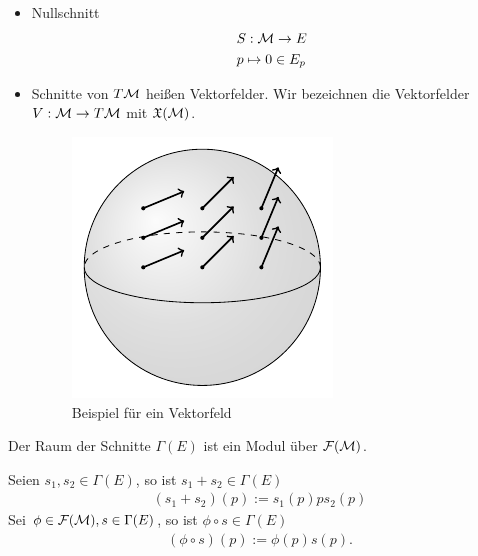 \begin{bsp}[Schnitte] \leavevmode
\begin{itemize}
\item Nullschnitt
\begin{align}
&S : \mathcal{M} \to E \\
&p \mapsto 0 \in E_p
\end{align}
\item Schnitte von $T\mathcal{M}$ heißen Vektorfelder.
Wir bezeichnen die Vektorfelder $V: \mathcal{M} \to T\mathcal{M}$ mit $\mathfrak{X}(\mathcal{M})$.

\begin{figure}[h]
\centering
\includegraphics[width=0.4\linewidth]{figures/tikz/vectorfield_on_manifold.pdf}
\caption{Beispiel für ein Vektorfeld}
\label{img:bspvektorfeld}
\end{figure} 

\end{itemize}
\end{bsp}


\begin{satz}
\label{satz:SchnitteModul}
Der Raum der Schnitte $\Gamma (E)$ ist ein Modul über $\mathcal{F}(\mathcal{M})$.
\end{satz}

\begin{bew}
Seien $s_1, s_2 \in \Gamma (E)$, so ist $s_1 + s_2 \in \Gamma (E)$
\begin{align}
(s_1 + s_2)(p) := s_1 (p) p s_2 (p)
\end{align}
Sei $\phi \in \mathcal{F}(\mathcal{M}), s\in \Gamma(E)$, so ist $\phi \circ s \in \Gamma (E)$
\begin{align}
(\phi \circ s) (p) := \phi (p) s(p).
\end{align}
\end{bew}

